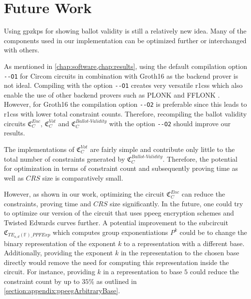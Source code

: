 \chapter{Future Work}
\label{chap:futureWork}

Using \glspl{gpzkp} for showing ballot validity is still a relatively new idea. 
Many of the components used in our implementation can be optimized further or interchanged with others.

As mentioned in \cref{chap:software,chap:results}, using the default compilation option \verb|--O1| for Circom circuits in combination with Groth16 as the backend prover is not ideal.
Compiling with the option \verb|--O1| creates very versatile \glspl{r1cs} which also enable the use of other backend provers such as PLONK and FFLONK \cite{gabizon_plonk_2019,gabizon_fflonk_2021}.
However, for Groth16 the compilation option \verb|--O2| is preferable since this leads to \glspl{r1cs} with lower total constraint counts.
Therefore, recompiling the ballot validity circuits $\mathfrak{C}_C^{Enc}$, $\mathfrak{C}_C^{Vot}$ and $\mathfrak{C}_C^{Ballot\text{-}Validity}$ with the option \verb|--O2| should improve our results.

The implementations of $\mathfrak{C}_C^{Vot}$ are fairly simple and contribute only little to the total number of constraints generated by $\mathfrak{C}_C^{Ballot\text{-}Validity}$.
Therefore, the potential for optimization in terms of constraint count and subsequently proving time as well as $CRS$ size is comparatively small.

However, as shown in our work, optimizing the circuit $\mathfrak{C}_C^{Enc}$ can reduce the constraints, proving time and $CRS$ size significantly.
In the future, one could try to optimize our version of the circuit that uses \gls{ppeeg} encryption schemes and Twisted Edwards curves further.
A potential improvement to the subcircuit $\mathfrak{C}_{TE_{a,d}(\mathbb{F})\_PPFExp}$ which computes group exponentiations $P^k$ could be to change the binary representation of the exponent $k$ to a representation with a different base.
Additionally, providing the exponent $k$ in the representation to the chosen base directly would remove the need for computing this representation inside the circuit.
For instance, providing $k$ in a representation to base $5$ could reduce the constraint count by up to $35\%$ as outlined in \cref{section:appendix:ppeegArbitraryBase}.

